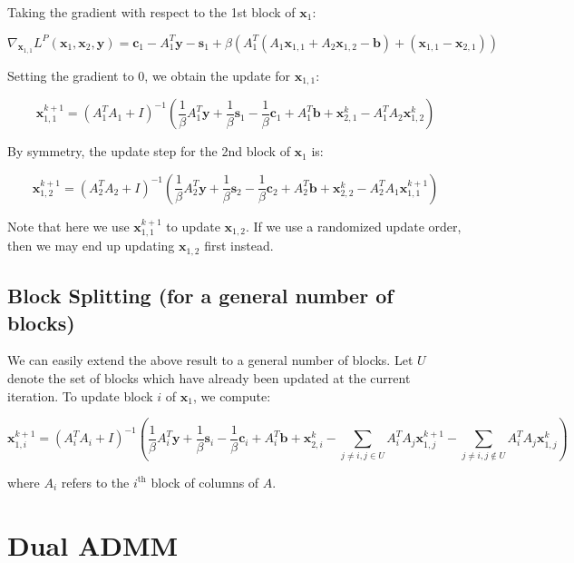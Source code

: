 \documentclass{article}
\begin{document}
Taking the gradient with respect to the 1st block of $\mathbf{x}_{1}$:

\[
\nabla_{\mathbf{x}_{1,1}}L^{P}(\mathbf{x}_{1},\mathbf{x}_{2},\mathbf{y})=\mathbf{c}_{1}-A_{1}^{T}\mathbf{y}-\mathbf{s}_{1}+\beta\left(A_{1}^{T}\left(A_{1}\mathbf{x}_{1,1}+A_{2}\mathbf{x}_{1,2}-\mathbf{b}\right)+\left(\mathbf{x}_{1,1}-\mathbf{x}_{2,1}\right)\right)
\]


Setting the gradient to 0, we obtain the update for $\mathbf{x}_{1,1}$:

\[
\mathbf{x}_{1,1}^{k+1}=\left(A_{1}^{T}A_{1}+I\right)^{-1}\left(\frac{1}{\beta}A_{1}^{T}\mathbf{y}+\frac{1}{\beta}\mathbf{s}_{1}-\frac{1}{\beta}\mathbf{c}_{1}+A_{1}^{T}\mathbf{b}+\mathbf{x}_{2,1}^{k}-A_{1}^{T}A_{2}\mathbf{x}_{1,2}^{k}\right)
\]


By symmetry, the update step for the 2nd block of $\mathbf{x}_{1}$
is:

\[
\mathbf{x}_{1,2}^{k+1}=\left(A_{2}^{T}A_{2}+I\right)^{-1}\left(\frac{1}{\beta}A_{2}^{T}\mathbf{y}+\frac{1}{\beta}\mathbf{s}_{2}-\frac{1}{\beta}\mathbf{c}_{2}+A_{2}^{T}\mathbf{b}+\mathbf{x}_{2,2}^{k}-A_{2}^{T}A_{1}\mathbf{x}_{1,1}^{k+1}\right)
\]


Note that here we use $\mathbf{x}_{1,1}^{k+1}$ to update $\mathbf{x}_{1,2}$.
If we use a randomized update order, then we may end up updating $\mathbf{x}_{1,2}$
first instead.


\subsection*{Block Splitting (for a general number of blocks)}

We can easily extend the above result to a general number of blocks.
Let $U$ denote the set of blocks which have already been updated
at the current iteration. To update block $i$ of $\mathbf{x}_{1}$,
we compute:

\[
\mathbf{x}_{1,i}^{k+1}=\left(A_{i}^{T}A_{i}+I\right)^{-1}\left(\frac{1}{\beta}A_{i}^{T}\mathbf{y}+\frac{1}{\beta}\mathbf{s}_{i}-\frac{1}{\beta}\mathbf{c}_{i}+A_{i}^{T}\mathbf{b}+\mathbf{x}_{2,i}^{k}-\sum_{j\neq i,j\in U}A_{i}^{T}A_{j}\mathbf{x}_{1,j}^{k+1}-\sum_{j\neq i,j\notin U}A_{i}^{T}A_{j}\mathbf{x}_{1,j}^{k}\right)
\]


where $A_{i}$ refers to the $i^{\text{th}}$ block of columns of
$A$.


\section*{Dual ADMM }
\end{document}
